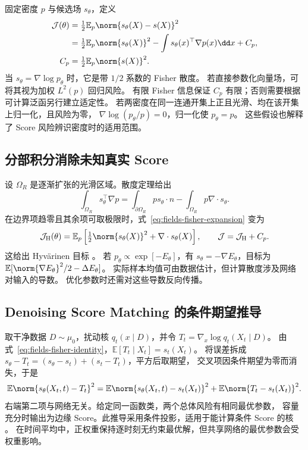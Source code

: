 固定密度 \(p\) 与候选场 \(s_\theta\)，定义
\begin{equation}
 \begin{aligned}
 \mathcal J(\theta)&=\tfrac12\mathbb E_p\norm{s_\theta(X)-s(X)}^2\\
 &=\tfrac12\mathbb E_p\norm{s_\theta(X)}^2
   -\int s_\theta(x)^\top\nabla p(x)\dd x+C_p,\\
 C_p&=\tfrac12\mathbb E_p\norm{s(X)}^2.
 \end{aligned}
 \label{eq:fields-fisher-expansion}
\end{equation}
当 \(s_\theta=\nabla\log p_\theta\) 时，它是带 \(1/2\) 系数的 Fisher 散度。
若直接参数化向量场，可将其视为加权 \(L^2(p)\) 回归风险。
有限 Fisher 信息保证 \(C_p\) 有限；否则需要根据可计算泛函另行建立适定性。
若两密度在同一连通开集上正且光滑、均在该开集上归一化，且风险为零，
\(\nabla\log(p_\theta/p)=0\)，归一化使 \(p_\theta=p\)。
这些假设也解释了 Score 风险辨识密度时的适用范围。

\subsection{分部积分消除未知真实 Score\requiredderivation}

设 \(\Omega_R\) 是逐渐扩张的光滑区域。散度定理给出
\[
 \int_{\Omega_R}s_\theta^\top\nabla p
 =\int_{\partial\Omega_R}p s_\theta\cdot n
                         -\int_{\Omega_R}p\nabla\cdot s_\theta.
\]
在边界项趋零且其余项可取极限时，式~\eqref{eq:fields-fisher-expansion} 变为
\begin{equation}
 \mathcal J_{\mathrm H}(\theta)
 =\mathbb E_p\left[\tfrac12\norm{s_\theta(X)}^2+
                                      \nabla\cdot s_\theta(X)\right],
 \qquad \mathcal J=\mathcal J_{\mathrm H}+C_p.
 \label{eq:fields-hyvarinen}
\end{equation}
这给出 Hyvärinen 目标 \cite{hyvarinen2005sm}。
若 \(p_\theta\propto\exp[-E_\theta]\)，有
\(s_\theta=-\nabla E_\theta\)，目标为
\(\mathbb E[\norm{\nabla E_\theta}^2/2-\Delta E_\theta]\)。
实际样本均值可由数据估计，但计算散度涉及网络对输入的导数。
优化参数时还需对这些导数反向传播。

\subsection{Denoising Score Matching 的条件期望推导\requiredderivation}

取干净数据 \(D\sim\mu_0\)，扰动核 \(q_t(x\mid D)\)，并令
\(T_t=\nabla_x\log q_t(X_t\mid D)\)。
由式~\eqref{eq:fields-fisher-identity}，\(\mathbb E[T_t\mid X_t]=s_t(X_t)\)。
将误差拆成 \(s_\theta-T_t=(s_\theta-s_t)+(s_t-T_t)\)，平方后取期望，
交叉项因条件期望为零而消失，于是
\begin{equation}
 \mathbb E\norm{s_\theta(X_t,t)-T_t}^2
 =\mathbb E\norm{s_\theta(X_t,t)-s_t(X_t)}^2
                         +\mathbb E\norm{T_t-s_t(X_t)}^2.
 \label{eq:fields-dsm-projection}
\end{equation}
右端第二项与网络无关。给定同一函数类，两个总体风险有相同最优参数，
容量充分时输出为边缘 Score。此推导采用条件投影，适用于能计算条件 Score 的核
\cite{vincent2011dsm}。
在时间平均中，正权重保持逐时刻无约束最优解，但共享网络的最优参数会受权重影响。

